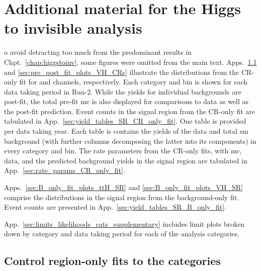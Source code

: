 \chapter{Additional material for the Higgs to invisible analysis}
\label{app:supplementary_hinv_plots}

o avoid detracting too much from the predominant results in Chpt.~\ref{chap:higgstoinv}, some figures were omitted from the main text. Apps.~\ref{sec:pre_post_fit_plots_ttH_CRs} and \ref{sec:pre_post_fit_plots_VH_CRs} illustrate the distributions from the \gls{CR}-only fit for \ttH and \VH channels, respectively. Each category and \ptmiss bin is shown for each data taking period in Run-2. While the yields for individual backgrounds are post-fit, the total pre-fit \acrshort{mc} is also displayed for comparisons to data as well as the post-fit prediction. Event counts in the signal region from the \gls{CR}-only fit are tabulated in App.~\ref{sec:yield_tables_SR_CR_only_fit}. One table is provided per data taking year. Each table is contains the yields of the data and total \acrshort{sm} background (with further columns decomposing the latter into its components) in every category and \ptmiss bin. The rate parameters from the \gls{CR}-only fits, with \acrshort{mc}, data, and the predicted background yields in the signal region are tabulated in App.~\ref{sec:rate_params_CR_only_fit}.

Apps.~\ref{sec:B_only_fit_plots_ttH_SR} and \ref{sec:B_only_fit_plots_VH_SR} comprise the distributions in the signal region from the background-only fit. Event counts are presented in App.~\ref{sec:yield_tables_SR_B_only_fit}.

App.~\ref{sec:limits_likelihoods_cats_supplementary} includes limit plots broken down by category and data taking period for each of the analysis categories.




\section{Control region-only fits to the \texorpdfstring{\ttH}{ttH} categories}
\label{sec:pre_post_fit_plots_ttH_CRs}

